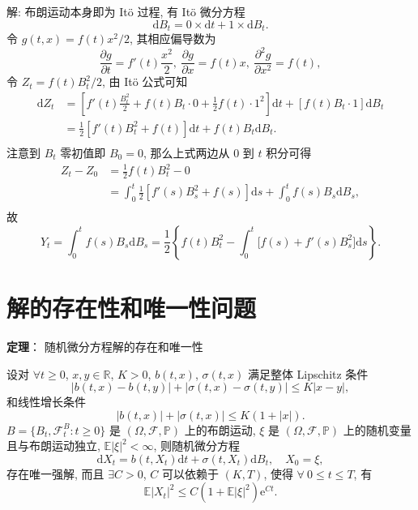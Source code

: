 \documentclass[openany]{ctexbook}
\theoremstyle{kaiti}
\theoremstyle{normal}
\begin{document}
解: 布朗运动本身即为 It\"o 过程, 有 It\"o 微分方程
\begin{equation}
  \mathrm{d}B_t=0\times\mathrm{d}t+1\times\mathrm{d}B_t.
\end{equation}
令 $g(t,x)=f(t)x^2/2$, 其相应偏导数为
\begin{equation}
  \frac{\partial g}{\partial t}=f'(t)\frac{x^2}{2},~
  \frac{\partial g}{\partial x}=f(t)x,~
  \frac{\partial^2 g}{\partial x^2}=f(t),
\end{equation}
令 $Z_t=f(t)B_t^2/2$, 由 It\"o 公式可知
\begin{equation}
  \begin{aligned}
    \mathrm{d}Z_t
    &=\left[f'(t)\frac{B_t^2}{2}+f(t)B_t\cdot0+\frac{1}{2}f(t)\cdot1^2\right]\mathrm{d}t+[f(t)B_t\cdot1]\mathrm{d}B_t\\
    &=\frac{1}{2}[f'(t)B_t^2+f(t)]\mathrm{d}t+f(t)B_t\mathrm{d}B_t.\\
  \end{aligned}
\end{equation}
注意到 $B_t$ 零初值即 $B_0=0$, 那么上式两边从 $0$ 到 $t$ 积分可得
\begin{equation}
  \begin{aligned}
    Z_t-Z_0
    &=\frac{1}{2}f(t)B_t^2-0\\
    &=\int_0^t\frac{1}{2}\left[f'(s)B_s^2+f(s)\right]\mathrm{d}s+\int_0^tf(s)B_s\mathrm{d}B_s,\\
  \end{aligned}
\end{equation}
故
\begin{equation}
  Y_t=\int_0^tf(s)B_s\mathrm{d}B_s=\frac{1}{2}\left\{f(t)B_t^2-\int_0^t\Big[f(s)+f'(s)B_s^2\Big]\mathrm{d}s\right\}.
\end{equation}

\section{解的存在性和唯一性问题}

\textbf{定理}： 随机微分方程解的存在和唯一性

设对 $\forall t\geqslant0$, $x,y\in\mathbb{R}$, $K>0$, $b(t,x)$, $\sigma(t,x)$ 满足整体 Lipschitz 条件
\begin{equation}
  |b(t,x)-b(t,y)|+|\sigma(t,x)-\sigma(t,y)|\leqslant K|x-y|,
\end{equation}
和线性增长条件
\begin{equation}
  |b(t,x)|+|\sigma(t,x)|\leqslant K(1+|x|).
\end{equation}
$B=\{B_t,\mathcal{F}_t^B:t\geqslant0\}$ 是 $(\Omega,\mathcal{F},\mathbb{P})$ 上的布朗运动, $\xi$ 是 $(\Omega,\mathcal{F},\mathbb{P})$ 上的随机变量且与布朗运动独立, $\mathbb{E}|\xi|^2<\infty$, 则随机微分方程
\begin{equation}
  \mathrm{d}X_t=b(t,X_t)\mathrm{d}t+\sigma(t,X_t)\mathrm{d}B_t,\quad X_0=\xi,
\end{equation}
存在唯一强解, 而且 $\exists C>0$, $C$ 可以依赖于 $(K,T)$, 使得 $\forall~0\leqslant t\leqslant T$, 有
\begin{equation}
  \mathbb{E}|X_t|^2\leqslant C(1+\mathbb{E}|\xi|^2)\mathrm{e}^{Ct}.
\end{equation}
\end{document}
